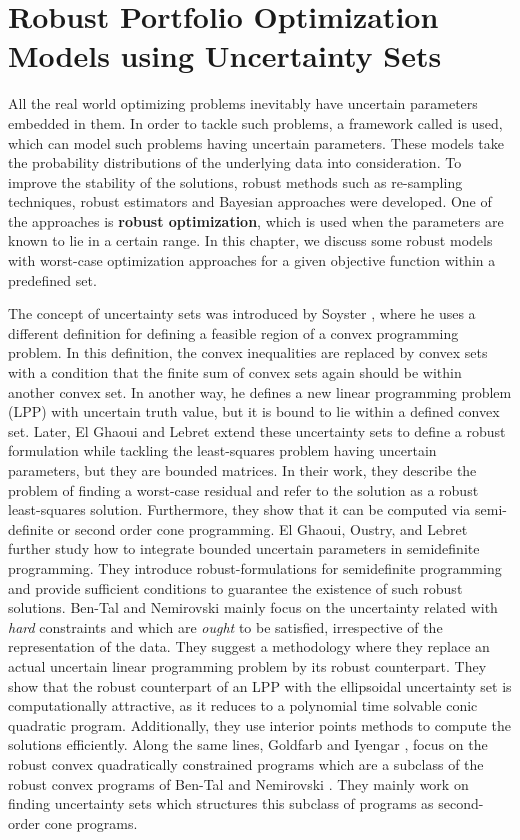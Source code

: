 \chapter{Robust Portfolio Optimization Models using Uncertainty Sets}

All the real world optimizing problems inevitably have uncertain parameters embedded in them. In order to tackle such problems, a framework called  \cite{stochastic_prog} is used, which can model such problems having uncertain parameters. These models take the probability distributions of the underlying data into consideration. To improve the stability of the solutions, robust methods such as re-sampling techniques, robust estimators and Bayesian approaches were developed. One of the approaches is \textbf{robust optimization}, which is used when the parameters are known to lie in a certain range. In this chapter, we discuss some robust models with worst-case optimization approaches for a given objective function within a predefined  set. 

The concept of uncertainty sets was introduced by Soyster \cite{soyster}, where he uses a different definition for defining a feasible region of a convex programming problem. In this definition, the convex inequalities are replaced by convex sets with a condition that the finite sum of convex sets again should be within another convex set. In another way, he defines a new linear programming problem (LPP) with uncertain truth value, but it is bound to lie within a defined convex set. Later, El Ghaoui and Lebret \cite{elg_lsq} extend these uncertainty sets to define a robust formulation while tackling the least-squares problem having uncertain parameters, but they are bounded matrices. In their work, they describe the problem of finding a worst-case residual and refer to the solution as a robust least-squares solution. Furthermore, they show that it can be computed via semi-definite or second order cone programming. El Ghaoui, Oustry, and Lebret \cite{elg_semidefinite} further study how to integrate bounded uncertain parameters in semidefinite programming. They introduce robust-formulations for semidefinite programming and provide sufficient conditions to guarantee the existence of such robust solutions. Ben-Tal and Nemirovski \cite{bental_rc} mainly focus on the uncertainty related with \textit{hard} constraints and which are \textit{ought} to be satisfied, irrespective of the representation of the data. They suggest a methodology where they replace an actual uncertain linear programming problem by its robust counterpart. They show that the robust counterpart  of an LPP with the ellipsoidal uncertainty set is computationally attractive, as it reduces to a polynomial time solvable conic quadratic program. Additionally, they use interior points methods \cite{bental_interior} to compute the solutions efficiently. Along the same lines, Goldfarb and Iyengar \cite{Goldfarb}, focus on the robust convex quadratically constrained programs which are a subclass of the robust convex programs of Ben-Tal and Nemirovski \cite{bental_rc}. They mainly work on finding uncertainty sets which structures this subclass of programs as second-order cone programs. 

